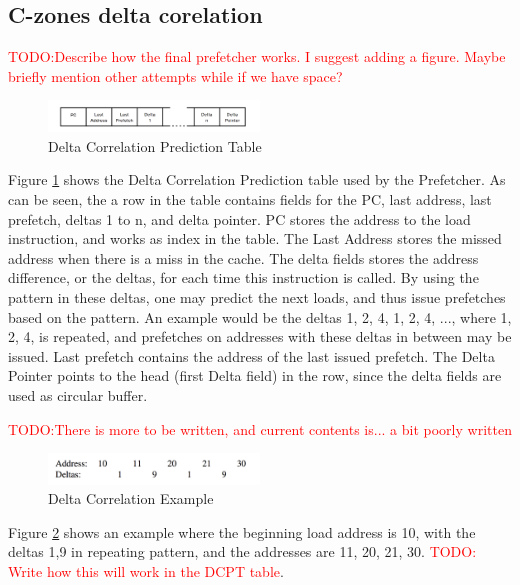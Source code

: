 \documentclass[a4paper]{IEEEtran}
\newcommand\TODO[1]{\textcolor{red}{TODO:#1}}
\newcommand\todo[1]{\TODO{#1}}
\begin{document}
\subsection{C-zones delta corelation}


\todo{Describe how the final prefetcher works. I suggest adding a figure. Maybe briefly mention other attempts while if we have space?}

\begin{figure}[h!]
  \centering
      \includegraphics[width=0.5\textwidth]{Figures/DCTable}
  \caption{Delta Correlation Prediction Table}
  \label{fig:DCTable}
\end{figure}

Figure \ref{fig:DCTable} shows the Delta Correlation Prediction table used by the Prefetcher.
As can be seen, the a row in the table contains fields for the PC, last address, last prefetch, deltas 1 to n, and delta pointer.
PC stores the address to the load instruction, and works as index in the table.
The Last Address stores the missed address when there is a miss in the cache.
The delta fields stores the address difference, or the deltas, for each time this instruction is called.
By using the pattern in these deltas, one may predict the next loads, and thus issue prefetches based on the pattern.
An example would be the deltas 1, 2, 4, 1, 2, 4, ..., where 1, 2, 4, is repeated, and prefetches on addresses with these deltas in between may be issued.
Last prefetch contains the address of the last issued prefetch.
The Delta Pointer points to the head (first Delta field) in the row, since the delta fields are used as circular buffer.

\todo{There is more to be written, and current contents is... a bit poorly written}

\begin{figure}[h!]
  \centering
      \includegraphics[width=0.5\textwidth]{Figures/DCExample}
  \caption{Delta Correlation Example}
  \label{fig:DCExample}
\end{figure}

Figure \ref{fig:DCExample} shows an example where the beginning load address is 10, with the deltas 1,9 in repeating pattern, and the addresses are 11, 20, 21, 30. 
\todo{ Write how this will work in the DCPT table}.
\end{document}
